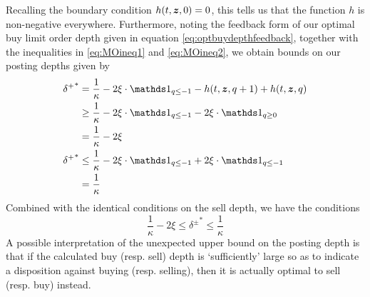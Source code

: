 Recalling the boundary condition $h(t,\bm{z},0) = 0$, this tells us that the function $h$ is non-negative everywhere. Furthermore, noting the feedback form of our optimal buy limit order depth given in equation \eqref{eq:optbuydepthfeedback}, together with the inequalities in \eqref{eq:MOineq1} and \eqref{eq:MOineq2}, we obtain bounds on our posting depths given by
\begin{align}
{\delta^+}^* & = \frac{1}{\kappa} - 2 \xi \cdot \indicator_{q \leq -1} - h(t,\bz,q+1) + h(t,\bz,q) \\
& \geq \frac{1}{\kappa} - 2 \xi \cdot \indicator_{q \leq -1} - 2 \xi \cdot \indicator_{q \geq 0} \\
& = \frac{1}{\kappa} - 2\xi \\
{\delta^+}^* & \leq \frac{1}{\kappa} - 2 \xi \cdot \indicator_{q \leq -1} + 2 \xi \cdot \indicator_{q \leq -1} \\
& = \frac{1}{\kappa}
\end{align}
Combined with the identical conditions on the sell depth, we have the conditions
\begin{equation}\label{eq:deltaslowerboundcase1}
\boxed{ \frac{1}{\kappa} - 2\xi  \leq {\delta^\pm}^* \leq \frac{1}{\kappa} }
\end{equation}
A possible interpretation of the unexpected upper bound on the posting depth is that if the calculated buy (resp. sell) depth is `sufficiently' large so as to indicate a disposition against buying (resp. selling), then it is actually optimal to sell (resp. buy) instead.